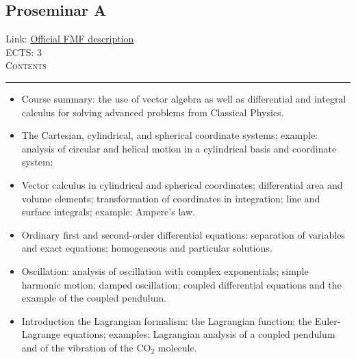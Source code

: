 \documentclass[11pt, a4paper]{article}
\newenvironment{course}[3]{
\subsection{#1}%
Link: \href{#2}{Official FMF description}\\%
ECTS: #3%
\vspace{1ex}
\\
{\large \textsc{Contents}}\\[-0.9ex]%
\rule{\textwidth}{0.5pt}
\vspace{-3ex}
}
{}
\newenvironment{chapter}[1]{
\begin{tcolorbox}[title=#1, breakable]
}
{\end{tcolorbox}}
\begin{document}
\begin{course}{Proseminar A}{https://www.fmf.uni-lj.si/en/study-physics/programmes/1fiz/2020/7000777/courses/1170/}{3}
    \label{proseminar_a}

    \begin{chapter}{Material}
        \begin{itemize}
            
            \item Course summary: the use of vector algebra as well as differential and integral calculus for solving advanced problems from Classical Physics.

            \item The Cartesian, cylindrical, and spherical coordinate systems; example: analysis of circular and helical motion in a cylindrical basis and coordinate system;

            \item Vector calculus in cylindrical and spherical coordinates; differential area and volume elements; transformation of coordinates in integration; line and surface integrals; example: Ampere's law.

            \item Ordinary first and second-order differential equations: separation of variables and exact equations; homogeneous and particular solutions.

            \item Oscillation: analysis of oscillation with complex exponentials; simple harmonic motion; damped oscillation; coupled differential equations and the example of the coupled pendulum.

            \item Introduction the Lagrangian formalism: the Lagrangian function; the Euler-Lagrange equations; examples: Lagrangian analysis of a coupled pendulum and of the vibration of the $ \mathrm{CO}_{2} $ molecule.

        \end{itemize}
    \end{chapter}

\end{course}
\end{document}
